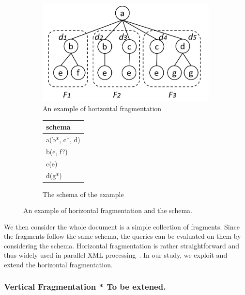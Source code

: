 \begin{figure}[t]
	\centering
	\begin{subfigure}{.6\textwidth}
		\centering
		\includegraphics[width=.99\linewidth]{figures/hfrag_example}
		\caption{An example of horizontal fragmentation}
		\label{fig:sub1}
	\end{subfigure}%
	\begin{subfigure}{.4\textwidth}
		\centering
		\vspace{12mm}
		\begin{tabular}{|l|}
			\hline
			schema\\
			\hline
			a(b*, c*, d) \\
			b(e, f?) \\
			c(e) \\
			d(g*) \\
			\hline
		\end{tabular}
		\vspace{12mm}
		\caption{The schema of the example}
		\label{fig:sub2}
	\end{subfigure}
	\caption{An example of horizontal fragmentation and the schema.}
	\label{fig:hfrag_example}
\end{figure}


We then consider the whole document is a simple collection of fragments. Since
the fragments follow the same schema, the queries can be evaluated on them by
considering the schema. Horizontal fragmentation is rather straightforward and
thus widely used in parallel XML processing~\cite{DaGP14,BoLS09,AfDG15,CCMN15}.
In our study, we exploit and extend the horizontal fragmentation. 

\subsubsection{Vertical Fragmentation * To be extened.} \label{sec:vfragment}


